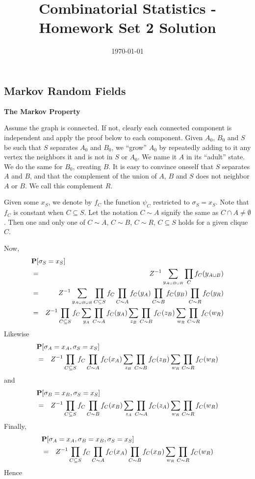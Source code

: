 \documentclass[11pt]{article} \usepackage{amssymb}
\begin{document}
\title{Combinatorial Statistics - Homework Set 2 Solution}

\date{\today}
\maketitle
\subsection{Markov Random Fields}
{\bf The Markov Property}

Assume the graph is connected. If not, clearly each connected component is
independent and apply the proof below to each component.
Given $A_0$, $B_0$ and $S$ be such that $S$ separates $A_0$ and $B_0$,
we ``grow'' $A_0$ by repeatedly adding to it any vertex the neighbors it
and is not in $S$ or $A_0$. We name it $A$ in its ``adult'' state. We do
the same for $B_0$, creating $B$. It is easy to
convince oneself that $S$ separates $A$ and $B$, and that the complement of the 
union of $A$, $B$ and $S$ does not neighbor $A$ or $B$. We call this complement
$R$.

Given some $x_S$, we denote by $f_C$ the function $\psi_C$ restricted
to $\sigma_S=x_S$. Note that $f_C$ is constant when $C\subseteq S$. Let the notation $C\sim A$ 
signify the same as $C\cap A\neq\emptyset$. Then one and only one of $C\sim A$, $C\sim B$,
$C\sim R$, $C\subseteq S$  holds for a given clique $C$.

Now,
\begin{eqnarray*}
  \lefteqn{\P[\sigma_S=x_S]}
\\ &=& Z^{-1}\sum_{y_{A\cup B\cup R}}\prod_Cf_C(y_{A\cup B})
\\ &=& Z^{-1}\sum_{y_{A\cup B\cup R}}\prod_{C\subseteq S}f_C\prod_{C\sim A}f_C(y_A)\prod_{C\sim B}f_C(y_B)\prod_{C\sim R}f_C(y_R)
\\ &=& Z^{-1}\prod_{C\subseteq S}f_C\sum_{y_A}\prod_{C\sim A}f_C(y_A)\sum_{z_B}\prod_{C\sim B}f_C(z_B)\sum_{w_R}\prod_{C\sim R}f_C(w_R)
\end{eqnarray*}
Likewise
\begin{eqnarray*}
  \lefteqn{\P[\sigma_A=x_A,\sigma_S=x_S]}
\\ &=& Z^{-1}\prod_{C\subseteq S}f_C\prod_{C\sim A}f_C(x_A)\sum_{z_B}\prod_{C\sim B}f_C(z_B)\sum_{w_R}\prod_{C\sim R}f_C(w_R)
\end{eqnarray*}
and
\begin{eqnarray*}
  \lefteqn{\P[\sigma_B=x_B,\sigma_S=x_S]}
\\ &=& Z^{-1}\prod_{C\subseteq S}f_C\prod_{C\sim B}f_C(x_B)\sum_{z_A}\prod_{C\sim A}f_C(z_A)\sum_{w_R}\prod_{C\sim R}f_C(w_R)
\end{eqnarray*}
Finally,
\begin{eqnarray*}
  \lefteqn{\P[\sigma_A=x_A,\sigma_B=x_B,\sigma_S=x_S]}
\\ &=& Z^{-1}\prod_{C\subseteq S}f_C\prod_{C\sim A}f_C(x_A)\prod_{C\sim B}f_C(x_B)\sum_{w_R}\prod_{C\sim R}f_C(w_R)
\end{eqnarray*}
Hence
\end{document}
